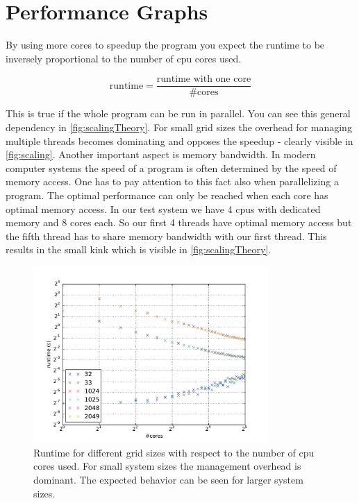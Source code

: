 \section{Performance Graphs}

By using more cores to speedup the program you expect the runtime to be inversely proportional to the number of cpu cores used.

\begin{equation}
\text{runtime} = \frac{\text{runtime with one core}}{\text{\#cores}}
\label{eq:runtime}
\end{equation}

This is true if the whole program can be run in parallel. You can see this general dependency in \autoref{fig:scalingTheory}. For small grid sizes the overhead for managing multiple threads becomes dominating and opposes the speedup - clearly visible in \autoref{fig:scaling}. Another important aspect is memory bandwidth. In modern computer systems the speed of a program is often determined by the speed of memory access. One has to pay attention to this fact also when parallelizing a program. The optimal performance can only be reached when each core has optimal memory access. In our test system we have 4 cpus with dedicated memory and 8 cores each. So our first 4 threads have optimal memory access but the fifth thread has to share memory bandwidth with our first thread. This results in the small kink which is visible in \autoref{fig:scalingTheory}.

\begin{figure}
	\centering
		\includegraphics[width=0.80\textwidth]{../img/scaling.pdf}
	\caption{Runtime for different grid sizes with respect to the number of cpu cores used. For small system sizes the management overhead is dominant. The expected behavior can be seen for larger system sizes.}
	\label{fig:scaling}
\end{figure}

